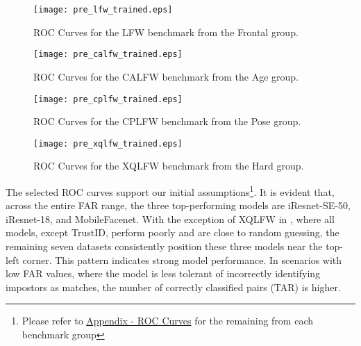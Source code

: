 \documentclass[class=report, crop=false, a4paper, 12pt]{standalone}
\begin{document}
\begin{figure}[H]
    \centering
    \begin{adjustbox}{center, minipage=1.2\textwidth, margin=0cm -0.1cm 0cm -0.1cm}  %
        \begin{minipage}[c]{0.49\textwidth}
            \centering
            \texttt{[image: pre\_lfw\_trained.eps]}
            \caption{ROC Curves for the LFW benchmark from the Frontal group.}
            \label{fig:roc_lfw}
        \end{minipage}
        \hfill
        \begin{minipage}[c]{0.49\textwidth}
            \centering
            \texttt{[image: pre\_calfw\_trained.eps]}
            \caption{ROC Curves for the CALFW benchmark from the Age group.}
            \label{fig:roc_calfw}
        \end{minipage}
    \end{adjustbox}
    \vspace{-0.4cm}
  \end{figure}
\vspace{-1cm}
\begin{figure}[H]
  \begin{adjustbox}{center, minipage=1.2\textwidth, margin=0cm -0.1cm 0cm -0.1cm}  %
      \begin{minipage}[c]{0.49\textwidth}
          \centering
          \texttt{[image: pre\_cplfw\_trained.eps]}
          \caption{ROC Curves for the CPLFW benchmark from the Pose group.}
          \label{fig:roc_cplfw}
      \end{minipage}
      \hfill
      \begin{minipage}[c]{0.49\textwidth}
          \centering
          \texttt{[image: pre\_xqlfw\_trained.eps]}
          \caption{ROC Curves for the XQLFW benchmark from the Hard group.}
          \label{fig:roc_xqlfw}
      \end{minipage}
  \end{adjustbox}
  \vspace{-0.4cm}
\end{figure}

\par The selected ROC curves support our initial assumptions\footnote{Please refer to \hyperref[sec:roc_curves_appendix]{Appendix - ROC Curves} for the remaining from each benchmark group}. It is evident that, across the entire FAR range, the three top-performing models are iResnet-SE-50, iResnet-18, and MobileFacenet. With the exception of XQLFW in , where all models, except TrustID, perform poorly and are close to random guessing, the remaining seven datasets consistently position these three models near the top-left corner. This pattern indicates strong model performance. In scenarios with low FAR values, where the model is less tolerant of incorrectly identifying impostors as matches, the number of correctly classified pairs (TAR) is higher.
\end{document}
